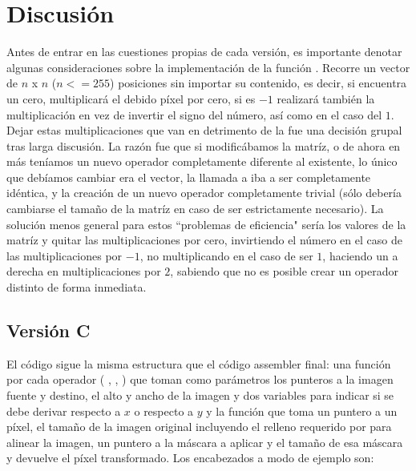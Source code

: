 \section{Discusi\'on}

Antes de entrar en las cuestiones propias de cada versi\'on, es importante denotar algunas consideraciones sobre la 
implementaci\'on de la funci\'on . Recorre un vector de $n$ x $n$ ($n<=255$) posiciones sin 
importar su contenido, es decir, si encuentra un cero, multiplicar\'a el debido p\'ixel por 
cero, si es $-1$ realizar\'a tambi\'en la multiplicaci\'on en vez de invertir el signo del n\'umero, as\'i como en el caso 
del $1$. Dejar estas multiplicaciones que van en detrimento de la  fue una decisi\'on grupal 
tras larga discusi\'on. La raz\'on fue que si modific\'abamos la matr\'iz, o de ahora en m\'as ten\'iamos un nuevo operador 
completamente diferente al existente, lo \'unico que deb\'iamos cambiar era el vector, la llamada a  
iba a ser completamente id\'entica, y la creaci\'on de un nuevo operador completamente trivial (s\'olo deber\'ia cambiarse 
el tama\~no de la matr\'iz en caso de ser estrictamente necesario). La soluci\'on menos general para estos ``problemas de
eficiencia" ser\'ia  los valores de la matr\'iz y quitar las multiplicaciones por cero, 
invirtiendo el n\'umero en el caso de las multiplicaciones por $-1$, no multiplicando en el caso de ser $1$, 
haciendo un  a derecha en multiplicaciones por $2$, sabiendo que no es posible crear un operador 
distinto de forma inmediata.

\subsection{Versi\'on C}

El c\'odigo sigue la misma estructura que el c\'odigo assembler final: una funci\'on por cada operador ( , 
,  ) que toman como par\'ametros los punteros a la imagen fuente y destino, el alto y 
ancho de la imagen y dos variables para indicar si se debe derivar respecto a $x$ o respecto a $y$ y la funci\'on 
 que toma un puntero a un p\'ixel, el tama\~no de la imagen original incluyendo el relleno requerido 
por  para alinear la imagen, un puntero a la m\'ascara a aplicar y el tama\~no de esa m\'ascara y devuelve 
el p\'ixel transformado. Los encabezados a modo de ejemplo son:\\

